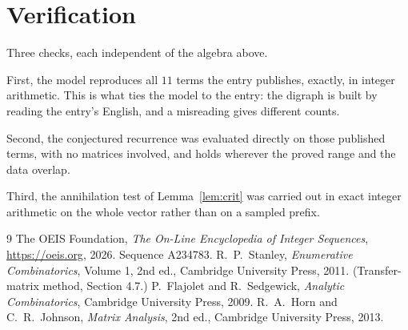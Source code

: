 \documentclass[11pt,a4paper]{article}
\theoremstyle{plain}
\theoremstyle{definition}
\begin{document}
\section{Verification}

Three checks, each independent of the algebra above.

First, the model reproduces all $11$ terms the entry publishes, exactly, in integer
arithmetic. This is what ties the model to the entry: the digraph is built by reading the
entry's English, and a misreading gives different counts.

Second, the conjectured recurrence was evaluated directly on those published terms, with no
matrices involved, and holds wherever the proved range and the data overlap.

Third, the annihilation test of Lemma~\ref{lem:crit} was carried out in exact integer
arithmetic on the whole vector rather than on a sampled prefix.

\begin{thebibliography}{9}
 The OEIS Foundation, \emph{The On-Line Encyclopedia of Integer
Sequences}, \url{https://oeis.org}, 2026. Sequence A234783.
 R.~P.~Stanley, \emph{Enumerative Combinatorics}, Volume 1, 2nd ed.,
Cambridge University Press, 2011. (Transfer-matrix method, Section 4.7.)
 P.~Flajolet and R.~Sedgewick, \emph{Analytic Combinatorics}, Cambridge
University Press, 2009.
 R.~A.~Horn and C.~R.~Johnson, \emph{Matrix Analysis}, 2nd ed., Cambridge
University Press, 2013.
\end{thebibliography}
\end{document}
